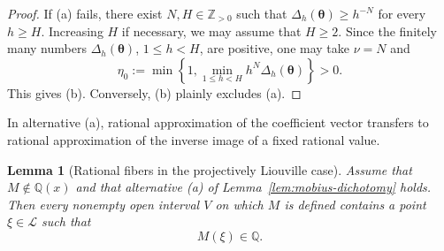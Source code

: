 \documentclass[11pt]{amsart}
\numberwithin{equation}{section}
\newtheorem{lemma}[lemma]{Lemma}
\theoremstyle{definition}
\theoremstyle{remark}
\newcommand{\Q}{\mathbb Q}
\newcommand{\Z}{\mathbb Z}
\newcommand{\Lio}{\mathscr L}
\begin{document}
\begin{proof}
If \textup{(a)} fails, there exist $N,H\in\Z_{>0}$ such that
$\Delta_h(\boldsymbol\theta)\geq h^{-N}$ for every $h\geq H$.
Increasing $H$ if necessary, we may assume that $H\geq2$.
Since the finitely many numbers $\Delta_h(\boldsymbol\theta)$,
$1\leq h<H$, are positive, one may take $\nu=N$ and
\[
\eta_0:=
\min\left\{
1,\min_{1\leq h<H}h^N\Delta_h(\boldsymbol\theta)
\right\}>0.
\]
This gives \textup{(b)}. Conversely, \textup{(b)} plainly excludes
\textup{(a)}.
\end{proof}

In alternative \textup{(a)}, rational approximation of the coefficient
vector transfers to rational approximation of the inverse image of a
fixed rational value.

\begin{lemma}[Rational fibers in the projectively Liouville case]
\label{lem:mobius-rational-fiber}
Assume that \(M\notin\Q(x)\) and that alternative \textup{(a)} of
Lemma~\ref{lem:mobius-dichotomy} holds. Then every nonempty open
interval \(V\) on which \(M\) is defined contains a point \(\xi\in\Lio\)
such that
\[
M(\xi)\in\Q.
\]
\end{lemma}
\end{document}

